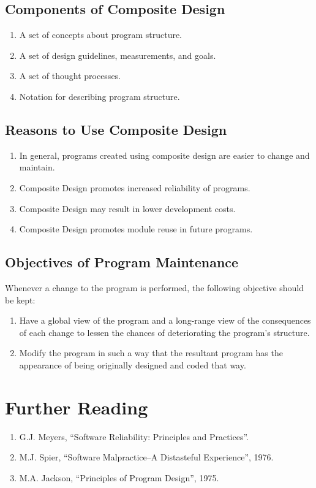 \documentclass[format.tex]{subfiles}
\begin{document}
\subsection{Components of Composite Design}
\begin{enumerate}
\item A set of concepts about program structure.
\item A set of design guidelines, measurements, and goals.
\item A set of thought processes.
\item Notation for describing program structure.
\end{enumerate}

\subsection{Reasons to Use Composite Design}
\begin{enumerate}
\item In general, programs created using composite design are easier to change
  and maintain.
\item Composite Design promotes increased reliability of programs.
\item Composite Design may result in lower development costs.
\item Composite Design promotes module reuse in future programs.
\end{enumerate}

\subsection{Objectives of Program Maintenance}
Whenever a change to the program is performed, the following objective should
be kept:
\begin{enumerate}
\item Have a global view of the program and a long-range view of the
  consequences of each change to lessen the chances of deteriorating the
  program's structure.
\item Modify the program in such a way that the resultant program has the
  appearance of being originally designed and coded that way.
\end{enumerate}

\section{Further Reading}
\begin{enumerate}
\item G.J. Meyers, ``Software Reliability: Principles and Practices''.
\item M.J. Spier, ``Software Malpractice--A Distasteful Experience'', 1976.
\item M.A. Jackson, ``Principles of Program Design'', 1975.  
\end{enumerate}
\end{document}

